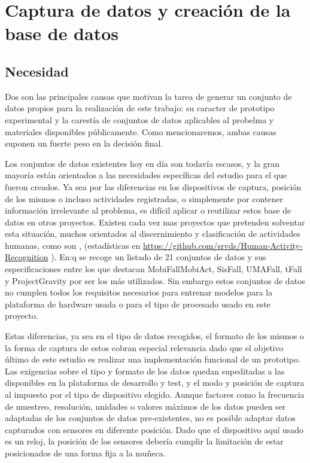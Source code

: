
\section{Captura de datos y creación de la base de datos}
\subsection{Necesidad}
Dos son las principales causas que motivan la tarea de generar un conjunto de datos propios para la realización de este trabajo: su caracter de prototipo experimental y la carestía de conjuntos de datos aplicables al probelma y materiales disponibles públicamente. Como mencionaremos, ambas causas suponen un fuerte peso en la decisión final.

Los conjuntos de datos existentes hoy en día son todavía escasos, y la gran mayoría están orientados a las necesidades específicas del estudio para el que fueron creados. Ya sea por las diferencias en los dispositivos de captura, posición de los mismos o incluso actividades registradas, o simplemente por contener información irrelevante al problema, es difícil aplicar o reutilizar estos base de datos en otros proyectos. Existen cada vez mas proyectos que pretenden solventar esta situación, muchos orientados al discernimiento y clasificación de actividades humanas, como son \cite{Anguita2013,ReyesOrtiz2014}, (estadísticas en \url{https://github.com/srvds/Human-Activity-Recognition} ). En:q
\cite{Casilari2020} se recoge un listado de 21 conjuntos de datos y sus especificaciones entre los que destacan MobiFall\cite{MobiFall}\/MobiAct\cite{MobiAct}, SisFall\cite{Sucerquia2017}, UMAFall\cite{Edu/UMA/2017}, tFall\cite{tfall} y ProjectGravity\cite{Vilarinho2015} por ser los más utilizados. Sin embargo estos conjuntos de datos no cumplen todos los requisitos necesarios para entrenar modelos para la plataforma de hardware usada o para el tipo de procesado usado en este proyecto.

Estas diferencias, ya sea en el tipo de datos recogidos, el formato de los mismos o la forma de captura de estos cobran especial relevancia dado que el objetivo último de este estudio es realizar una implementación funcional de un prototipo. Las exigencias sobre el tipo y formato de los datos quedan supeditadas a las disponibles en la plataforma de desarrollo y test, y el modo y posición de captura al impuesto por el tipo de dispositivo elegido. Aunque factores como la frecuencia de muestreo, resolución, unidades o valores máximos de los datos pueden ser adaptadas de los conjuntos de datos pre-existentes, no es posible adaptar datos capturados con sensores en diferente posición. Dado que el dispositivo aquí usado es un reloj, la posición de los sensores debería cumplir la limitación de estar posicionados de una forma fija a la muñeca.

